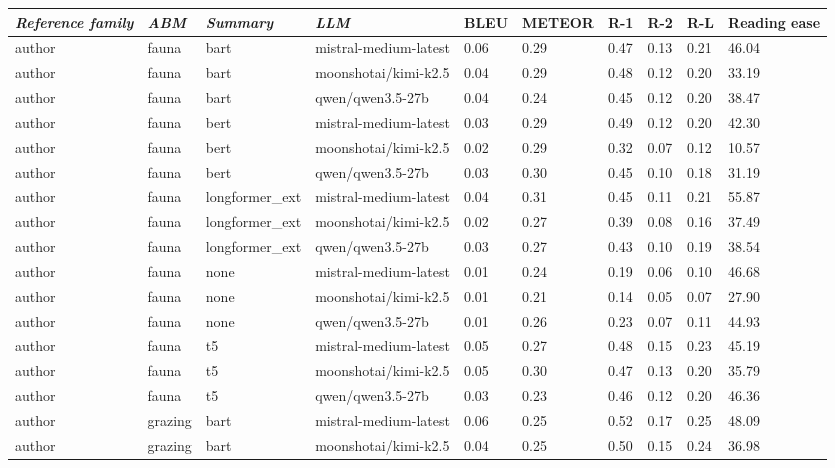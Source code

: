 \begin{tabular}{|l|l|l|l|l|l|l|l|l|l|}
\hline
\textit{\textbf{Reference family}} & \textit{\textbf{ABM}} & \textit{\textbf{Summary}} & \textit{\textbf{LLM}} & BLEU & METEOR & R-1 & R-2 & R-L & Reading ease \\
 \hline
 author & fauna & bart & mistral-medium-latest & 0.06 & 0.29 & 0.47 & 0.13 & 0.21 & 46.04 \\
 \hline
 author & fauna & bart & moonshotai/kimi-k2.5 & 0.04 & 0.29 & 0.48 & 0.12 & 0.20 & 33.19 \\
 \hline
 author & fauna & bart & qwen/qwen3.5-27b & 0.04 & 0.24 & 0.45 & 0.12 & 0.20 & 38.47 \\
 \hline
 author & fauna & bert & mistral-medium-latest & 0.03 & 0.29 & 0.49 & 0.12 & 0.20 & 42.30 \\
 \hline
 author & fauna & bert & moonshotai/kimi-k2.5 & 0.02 & 0.29 & 0.32 & 0.07 & 0.12 & 10.57 \\
 \hline
 author & fauna & bert & qwen/qwen3.5-27b & 0.03 & 0.30 & 0.45 & 0.10 & 0.18 & 31.19 \\
 \hline
 author & fauna & longformer\_ext & mistral-medium-latest & 0.04 & 0.31 & 0.45 & 0.11 & 0.21 & 55.87 \\
 \hline
 author & fauna & longformer\_ext & moonshotai/kimi-k2.5 & 0.02 & 0.27 & 0.39 & 0.08 & 0.16 & 37.49 \\
 \hline
 author & fauna & longformer\_ext & qwen/qwen3.5-27b & 0.03 & 0.27 & 0.43 & 0.10 & 0.19 & 38.54 \\
 \hline
 author & fauna & none & mistral-medium-latest & 0.01 & 0.24 & 0.19 & 0.06 & 0.10 & 46.68 \\
 \hline
 author & fauna & none & moonshotai/kimi-k2.5 & 0.01 & 0.21 & 0.14 & 0.05 & 0.07 & 27.90 \\
 \hline
 author & fauna & none & qwen/qwen3.5-27b & 0.01 & 0.26 & 0.23 & 0.07 & 0.11 & 44.93 \\
 \hline
 author & fauna & t5 & mistral-medium-latest & 0.05 & 0.27 & 0.48 & 0.15 & 0.23 & 45.19 \\
 \hline
 author & fauna & t5 & moonshotai/kimi-k2.5 & 0.05 & 0.30 & 0.47 & 0.13 & 0.20 & 35.79 \\
 \hline
 author & fauna & t5 & qwen/qwen3.5-27b & 0.03 & 0.23 & 0.46 & 0.12 & 0.20 & 46.36 \\
 \hline
 author & grazing & bart & mistral-medium-latest & 0.06 & 0.25 & 0.52 & 0.17 & 0.25 & 48.09 \\
 \hline
 author & grazing & bart & moonshotai/kimi-k2.5 & 0.04 & 0.25 & 0.50 & 0.15 & 0.24 & 36.98 \\

\end{tabular}
